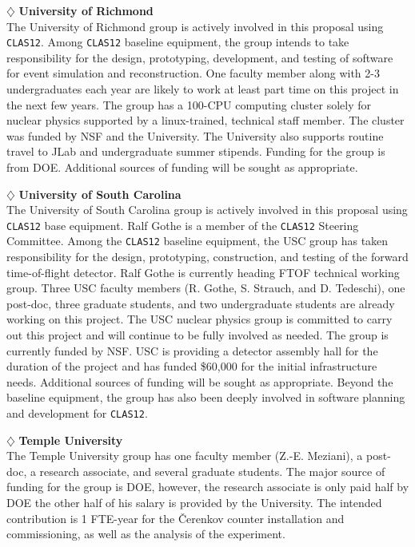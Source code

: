 \vskip 0.4cm

\noindent
$\diamondsuit$ {\bf University of Richmond} \\[0.2ex]

\noindent
The University of Richmond group is actively involved in this proposal using 
{\tt CLAS12}.  Among {\tt CLAS12} baseline equipment, the group intends to 
take responsibility for the design, prototyping, development, and testing of 
software for event simulation and reconstruction.  One faculty member along 
with 2-3 undergraduates each year are likely to work at least part time on 
this project in the next few years.  The group has a 100-CPU computing 
cluster solely for nuclear physics supported by a linux-trained, technical 
staff member.  The cluster was funded by NSF and the University. The 
University also supports routine travel to JLab and undergraduate summer 
stipends.  Funding for the group is from DOE.  Additional sources of funding 
will be sought as appropriate.

\vskip 0.4cm

\noindent
$\diamondsuit$ {\bf University of South Carolina} \\[0.2ex]

\noindent
The University of South Carolina group is actively involved in this proposal 
using {\tt CLAS12} base equipment.  Ralf Gothe is a member of the {\tt CLAS12}
Steering Committee.  Among the {\tt CLAS12} baseline equipment, the USC 
group has taken responsibility for the design, prototyping, construction, 
and testing of the forward time-of-flight detector.  Ralf Gothe is currently 
heading FTOF technical working group.  Three USC faculty members (R. Gothe, 
S. Strauch, and D. Tedeschi), one post-doc, three graduate students, and 
two undergraduate students are already working on this project.  The USC 
nuclear physics group is committed to carry out this project and will 
continue to be fully involved as needed.  The group is currently funded by 
NSF. USC is providing a detector assembly hall for the duration of the 
project and has funded \$60,000 for the initial infrastructure needs. 
Additional sources of funding will be sought as appropriate.  Beyond the 
baseline equipment, the group has also been deeply involved in software 
planning and development for {\tt CLAS12}.

\vskip 0.4cm

\noindent
$\diamondsuit$ {\bf Temple University} \\[0.2ex]

\noindent
The Temple University group has one faculty member (Z.-E. Meziani), a 
post-doc, a research associate, and several graduate students.  The major 
source of funding for the group is DOE, however, the research associate is 
only paid half by DOE the other half of his salary is provided by the 
University.  The intended contribution is 1 FTE-year for the {\v C}erenkov 
counter installation and commissioning, as well as the analysis of the 
experiment.


